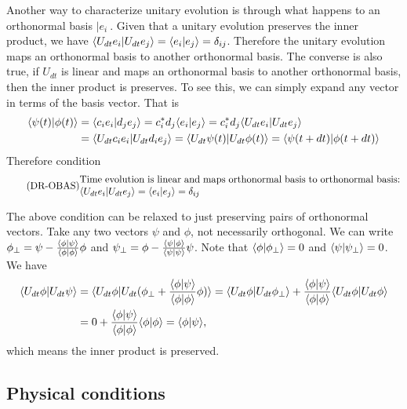 Another way to characterize unitary evolution is through what happens to an orthonormal basis $|e_i\>$. Given that a unitary evolution preserves the inner product, we have $\langle U_{d t} e_i | U_{d t} e_j \rangle = \langle e_i | e_j \rangle = \delta_{ij}$. Therefore the unitary evolution maps an orthonormal basis to another orthonormal basis. The converse is also true, if $U_{dt}$ is linear and maps an orthonormal basis to another orthonormal basis, then the inner product is preserves. To see this, we can simply expand any vector in terms of the basis vector. That is
\begin{equation}
	\begin{aligned}
		\langle\psi(t) | \phi(t)\rangle &= \langle c_i e_i | d_j e_j\rangle = c_i^* d_j \langle e_i | e_j\rangle = c_i^* d_j \langle U_{d t} e_i | U_{d t} e_j\rangle \\
		&= \langle U_{d t} c_i e_i | U_{d t} d_i e_j\rangle = \langle U_{d t} \psi(t) | U_{d t} \phi(t)\rangle = \langle \psi(t + d t) | \phi(t + d t)\rangle \\
	\end{aligned}
\end{equation}
Therefore condition
\begin{equation}\label{rp-qm-uev-condOrthonormalBasis}
	\tag{DR-OBAS}
	\eqtext{Time evolution is linear and maps orthonormal basis to orthonormal basis: $\< U_{d t} e_i | U_{d t} e_j \> = \< e_i | e_j \> = \delta_{ij}$} 
\end{equation}

The above condition can be relaxed to just preserving pairs of orthonormal vectors. Take any two vectors $\psi$ and $\phi$, not necessarily orthogonal. We can write $\phi_{\perp} = \psi - \frac{\langle\phi | \psi\rangle}{\langle\phi | \phi\rangle }\phi $ and $\psi_{\perp} = \phi - \frac{\langle\psi | \phi\rangle}{\langle\psi | \psi\rangle }\psi $. Note that $\langle\phi | \phi_{\perp}\rangle = 0$ and $\langle\psi | \psi_{\perp}\rangle = 0$. We have
\begin{equation}
	\begin{aligned}
		\langle U_{dt} \phi | U_{dt} \psi \rangle &= \langle U_{dt} \phi | U_{dt} (\phi_{\perp} + \frac{\langle\phi | \psi\rangle}{\langle\phi | \phi\rangle }\phi) \rangle = \langle U_{dt} \phi | U_{dt} \phi_{\perp}\rangle + \frac{\langle\phi | \psi\rangle}{\langle\phi | \phi\rangle } \langle U_{dt} \phi | U_{dt} \phi \rangle \\
		&= 0 + \frac{\langle\phi | \psi\rangle}{\langle\phi | \phi\rangle } \langle \phi | \phi \rangle = \langle\phi | \psi\rangle,
	\end{aligned}
\end{equation}
which means the inner product is preserved.

\subsection{Physical conditions}

